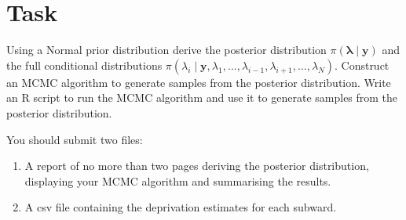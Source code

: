 \documentclass{article}
\begin{document}
\section{Task}
Using a Normal prior distribution derive the posterior distribution $\pi(\boldsymbol{\lambda} \mid \boldsymbol{y})$ and the full conditional distributions $\pi(\lambda_i \mid \boldsymbol{y}, \lambda_1, \ldots, \lambda_{i-1}, \lambda_{i+1}, \ldots, \lambda_N)$. Construct an MCMC algorithm to generate samples from the posterior distribution. Write an R script to run the MCMC algorithm and use it to generate samples from the posterior distribution. 

You should submit two files:
\begin{enumerate}
	\item A report of no more than two pages deriving the posterior distribution, displaying your MCMC algorithm and summarising the results. 
	\item A csv file containing the deprivation estimates for each subward. 
\end{enumerate}
 
\end{document}
